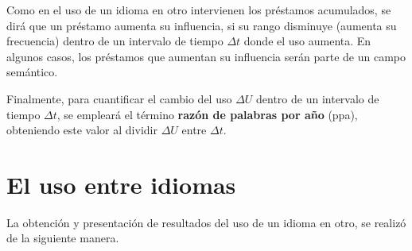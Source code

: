 Como en el uso de un idioma en otro intervienen los préstamos acumulados, se dirá que un préstamo aumenta su influencia, si su rango disminuye (aumenta su frecuencia) dentro de un intervalo de tiempo $\Delta t$ donde el uso aumenta. En algunos casos, los préstamos  que aumentan su influencia serán parte de un campo semántico.

Finalmente, para cuantificar el cambio del uso $\Delta U$ dentro de un  intervalo de tiempo $\Delta t$, se  empleará el término \textbf{razón de palabras por año}  (ppa), obteniendo este valor al dividir $\Delta U$ entre $\Delta t$. 







\section {El uso entre idiomas}  %
La obtención y presentación de resultados del uso de un idioma en otro, se realizó de la siguiente manera.


